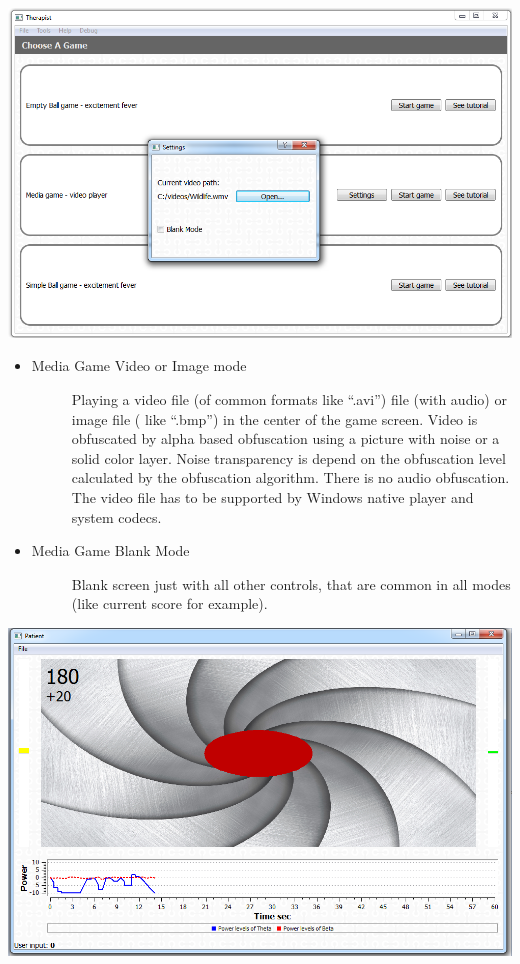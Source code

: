 \documentclass[letterpaper,10pt,english]{sphinxmanual}
\begin{document}
{\hfill\includegraphics{MediaGameSettings.PNG}\hfill}
\begin{itemize}
\item {} \begin{description}
\item[{Media Game Video or Image mode}] \leavevmode
Playing a video file (of common formats like “.avi”) file (with audio) or image file ( like “.bmp”) in the center of the game screen. Video is obfuscated by alpha based obfuscation using a picture with noise or a solid color layer. Noise transparency is depend on the obfuscation level calculated by the obfuscation algorithm. There is no audio obfuscation. The video file has to be supported by Windows native player and system codecs.

\end{description}

\item {} \begin{description}
\item[{Media Game Blank Mode}] \leavevmode
Blank screen just with all other controls, that are common in all modes (like current score for example).

\end{description}

\end{itemize}

{\hfill\includegraphics{MediaGameBlankMode.PNG}\hfill}
\end{document}
